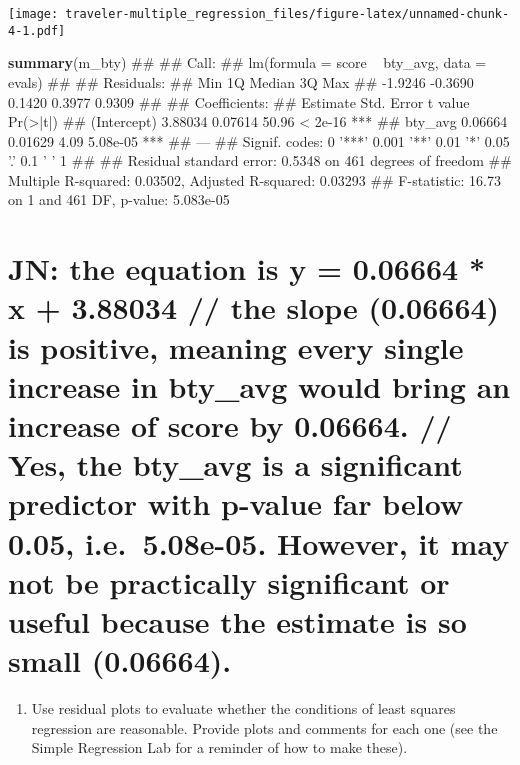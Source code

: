 \documentclass[]{article}
\newenvironment{Shaded}{\begin{snugshade}}{\end{snugshade}}
\newcommand{\KeywordTok}[1]{\textcolor[rgb]{0.13,0.29,0.53}{\textbf{#1}}}
\newcommand{\NormalTok}[1]{#1}
\providecommand{\tightlist}{%
  \setlength{\itemsep}{0pt}\setlength{\parskip}{0pt}}
\begin{document}
\texttt{[image: traveler-multiple\_regression\_files/figure-latex/unnamed-chunk-4-1.pdf]}

\begin{Shaded}
\begin{Highlighting}[]
\KeywordTok{summary}\NormalTok{(m_bty)}
\NormalTok{## }
\NormalTok{## Call:}
\NormalTok{## lm(formula = score ~ bty_avg, data = evals)}
\NormalTok{## }
\NormalTok{## Residuals:}
\NormalTok{##     Min      1Q  Median      3Q     Max }
\NormalTok{## -1.9246 -0.3690  0.1420  0.3977  0.9309 }
\NormalTok{## }
\NormalTok{## Coefficients:}
\NormalTok{##             Estimate Std. Error t value Pr(>|t|)    }
\NormalTok{## (Intercept)  3.88034    0.07614   50.96  < 2e-16 ***}
\NormalTok{## bty_avg      0.06664    0.01629    4.09 5.08e-05 ***}
\NormalTok{## ---}
\NormalTok{## Signif. codes:  0 '***' 0.001 '**' 0.01 '*' 0.05 '.' 0.1 ' ' 1}
\NormalTok{## }
\NormalTok{## Residual standard error: 0.5348 on 461 degrees of freedom}
\NormalTok{## Multiple R-squared:  0.03502,    Adjusted R-squared:  0.03293 }
\NormalTok{## F-statistic: 16.73 on 1 and 461 DF,  p-value: 5.083e-05}
\end{Highlighting}
\end{Shaded}

\section{JN: the equation is y = 0.06664 * x + 3.88034 // the slope
(0.06664) is positive, meaning every single increase in bty\_avg would
bring an increase of score by 0.06664. // Yes, the bty\_avg is a
significant predictor with p-value far below 0.05, i.e.~5.08e-05.
However, it may not be practically significant or useful because the
estimate is so small
(0.06664).}\label{jn-the-equation-is-y-0.06664-x-3.88034-the-slope-0.06664-is-positive-meaning-every-single-increase-in-bty_avg-would-bring-an-increase-of-score-by-0.06664.-yes-the-bty_avg-is-a-significant-predictor-with-p-value-far-below-0.05-i.e.5.08e-05.-however-it-may-not-be-practically-significant-or-useful-because-the-estimate-is-so-small-0.06664.}

\begin{enumerate}
\def\labelenumi{\arabic{enumi}.}
\setcounter{enumi}{5}
\tightlist
\item
  Use residual plots to evaluate whether the conditions of least squares
  regression are reasonable. Provide plots and comments for each one
  (see the Simple Regression Lab for a reminder of how to make these).
\end{enumerate}
\end{document}

